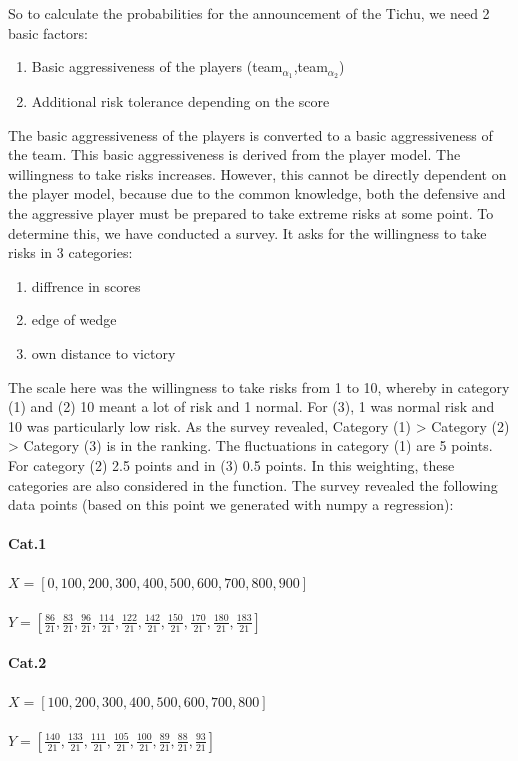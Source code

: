 So to calculate the probabilities for the announcement of the Tichu, we need 2 basic factors:
\begin{enumerate}
\item Basic aggressiveness of the players (team$_{\alpha_1}$,team$_{\alpha_2}$)
\item  Additional risk tolerance depending on the score
\end{enumerate}
The basic aggressiveness of the players is converted to a basic aggressiveness of the team. This basic aggressiveness is derived from the player model.
The willingness to take risks increases. However, this cannot be directly dependent on the player model, because due to the common knowledge, both the defensive and the aggressive player must be prepared to take extreme risks at some point.
To determine this, we have conducted a survey. It asks for the willingness to take risks in 3 categories:
\begin{enumerate}[(1)]
\item diffrence in scores
\item edge of wedge
\item own distance to victory
\end{enumerate}
The scale here was the willingness to take risks from 1 to 10, whereby in category (1) and (2) 10 meant a lot of risk and 1 normal. For (3), 1 was normal risk and 10 was particularly low risk.
 As the survey revealed, Category (1) > Category (2) > Category (3) is in the ranking. The fluctuations in category (1) are 5 points.
 For category (2) 2.5 points and in (3) 0.5 points. In this weighting, these categories are also considered in the function.
The survey revealed the following data points (based on this point we generated with numpy a regression):
\paragraph{Cat.1}
$X=[0,100,200,300,400,500,600,700,800,900]$ \\ \\
$Y=[\frac{86}{21},\frac{83}{21},\frac{96}{21},\frac{114}{21},\frac{122}{21},\frac{142}{21},\frac{150}{21},\frac{170}{21},\frac{180}{21},\frac{183}{21}]$\\
\paragraph{Cat.2}\par
$X=[100,200,300,400,500,600,700,800]$ \\ \\
$Y=[\frac{140}{21},\frac{133}{21},\frac{111}{21},\frac{105}{21},\frac{100}{21},\frac{89}{21},\frac{88}{21},\frac{93}{21}]$\\
